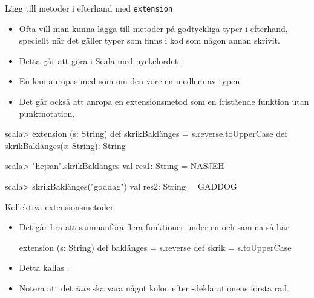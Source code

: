 \begin{Slide}{Lägg till metoder i efterhand med \texttt{extension}}\SlideFontSmall
\begin{itemize}\SlideFontSmall
\item Ofta vill man kunna lägga till metoder på godtyckliga typer i efterhand, speciellt när det gäller typer som finns i kod som någon annan skrivit.
\item Detta går att göra i Scala med nyckelordet :\\{\SlideFontTiny{}}
\item En  kan anropas med  som om den vore en medlem av typen.
\item Det går också att anropa en extensionsmetod som en fristående funktion utan punktnotation.
\end{itemize}  
\begin{REPL}
scala> extension (s: String) def skrikBaklänges = s.reverse.toUpperCase
def skrikBaklänges(s: String): String

scala> "hejsan".skrikBaklänges
val res1: String = NASJEH

scala> skrikBaklänges("goddag")
val res2: String = GADDOG
\end{REPL}
\end{Slide}

\begin{Slide}{Kollektiva extensionsmetoder}
\begin{itemize}
  \item 
Det går bra att sammanföra flera funktioner under en och samma  så här:
\begin{Code}
extension (s: String)
  def baklänges = s.reverse
  def skrik = s.toUpperCase
\end{Code}
\item Detta kallas . 
\item Notera att det \emph{inte} ska vara något kolon efter -deklarationens första rad.
  
\end{itemize}
\end{Slide}


